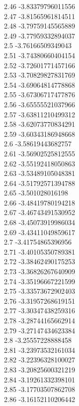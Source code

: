 {2.46	-3.83379796011556\\
2.47	-3.81565961814511\\
2.48	-3.79759145565889\\
2.49	-3.77959332894037\\
2.5	-3.76166509349043\\
2.51	-3.74380660404154\\
2.52	-3.72601771457166\\
2.53	-3.70829827831769\\
2.54	-3.69064814778868\\
2.55	-3.67306717477876\\
2.56	-3.65555521037966\\
2.57	-3.63811210499312\\
2.58	-3.62073770834291\\
2.59	-3.60343186948668\\
2.6	-3.58619443682757\\
2.61	-3.56902525812555\\
2.62	-3.55192418050863\\
2.63	-3.53489105048381\\
2.64	-3.51792571394788\\
2.65	-3.501028016198\\
2.66	-3.48419780194218\\
2.67	-3.46743491530952\\
2.68	-3.45073919986034\\
2.69	-3.43411049859617\\
2.7	-3.41754865396956\\
2.71	-3.40105350789381\\
2.72	-3.38462490175253\\
2.73	-3.36826267640909\\
2.74	-3.35196667221599\\
2.75	-3.33573672902403\\
2.76	-3.31957268619151\\
2.77	-3.30347438259316\\
2.78	-3.28744165662914\\
2.79	-3.27147434623384\\
2.8	-3.25557228888458\\
2.81	-3.23973532161034\\
2.82	-3.22396328100027\\
2.83	-3.20825600321219\\
2.84	-3.19261332398101\\
2.85	-3.17703507862708\\
2.86	-3.16152110206442\\
}
